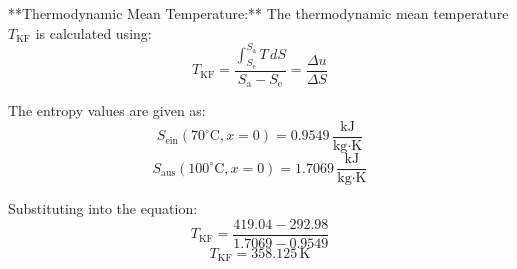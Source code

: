 **Thermodynamic Mean Temperature:**  
The thermodynamic mean temperature \( T_{\text{KF}} \) is calculated using:  
\[
T_{\text{KF}} = \frac{\int_{S_{\text{e}}}^{S_{\text{a}}} T \, dS}{S_{\text{a}} - S_{\text{e}}} = \frac{\Delta u}{\Delta S}
\]  

The entropy values are given as:  
\[
S_{\text{ein}} (70^\circ\text{C}, x = 0) = 0.9549 \, \frac{\text{kJ}}{\text{kg·K}}
\]  
\[
S_{\text{aus}} (100^\circ\text{C}, x = 0) = 1.7069 \, \frac{\text{kJ}}{\text{kg·K}}
\]  

Substituting into the equation:  
\[
T_{\text{KF}} = \frac{419.04 - 292.98}{1.7069 - 0.9549}
\]  
\[
T_{\text{KF}} = 358.125 \, \text{K}
\]